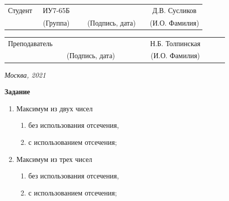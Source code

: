 \documentclass[12pt, a4paper]{extarticle}
\begin{document}
\noindent
{}
\\

\noindent
{}
\\

\vspace{1.5cm}
\noindent
\begin{tabular}{l c c c c c}
	Студент      & ~ИУ7-65Б~               & \hspace{2.5cm} & \hspace{2cm}                 & &  Д.В. Сусликов \\\cline{2-2}\cline{4-4} \cline{6-6} 
	\hspace{3cm} & {\footnotesize(Группа)} &                & {\footnotesize(Подпись, дата)} & & {\footnotesize(И.О. Фамилия)}
\end{tabular}

\noindent
\begin{tabular}{l c c c c}
	Преподаватель & \hspace{5cm}   & \hspace{2cm}                 & & ~~~~~~Н.Б. Толпинская~~~~~~\\\cline{3-3} \cline{5-5} 
	\hspace{3cm}  &                & {\footnotesize(Подпись, дата)} & & {\footnotesize(И.О. Фамилия)}
\end{tabular}

\vspace{0.6cm}
\begin{center}	
	\vfill
	\large \textit {Москва, 2021}
\end{center}

\thispagestyle {empty}
\pagebreak

\clearpage

\textbf{Задание}\par

\begin{enumerate}
	\item Максимум из двух чисел
	\begin{enumerate}
		\item без использования отсечения,
		\item с использованием отсечения;
	\end{enumerate}
	\item Максимум из трех чисел 
	\begin{enumerate}
		\item без использования отсечения,
		\item с использованием отсечения;
	\end{enumerate}
\end{enumerate}
\end{document}
